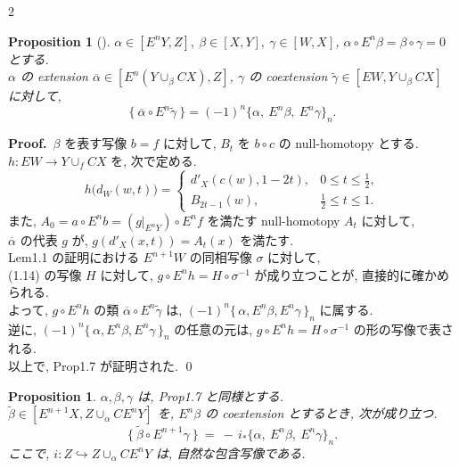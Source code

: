 \documentclass[10pt, leqno]{ltjsarticle}
\newcommand{\Ex}{E}        %
\newcommand{\todai}[2][]{\{\,#2\,\}_{#1}}      %
\numberwithin{equation}{section}
\theoremstyle{plain}
\newtheorem{proposition}[theorem]{Proposition}
\theoremstyle{definition}
\theoremstyle{remark}
\begin{document}
\begin{paracol}{2}

\begin{proposition}[]\label{prop:1-7}
\(\alpha\in[E^nY, Z],\ \beta\in[X,Y],\ \gamma\in[W,X]\),
$\alpha\circ \Ex^n\beta=\beta\circ\gamma=0$ とする. \\
$\alpha$ の extension $\overline\alpha\in[\Ex^n(Y\cup_\beta CX), Z]$,
$\gamma$ の coextension $\widetilde\gamma\in[EW, Y\cup_\beta CX]$ に対して,
\[
\{\ \overline\alpha\circ \Ex^n\widetilde\gamma\ \}
= (-1)^n\{\alpha,\ \Ex^n\beta,\ \Ex^n\gamma\}_n.
\]
\end{proposition}

\noindent
\textbf{Proof.}\
\(\beta\) を表す写像 \(b = f\) に対して, 
\(B_t\) を \(b\circ c\) の null-homotopy とする.\\
$h:EW\to Y\cup_f CX$ を,
次で定める.
\[
h\bigl(d_W(w,t)\bigr)=
\begin{cases}
d'_X(c(w),1-2t), & 0\le t\le \tfrac12,\\
B_{2t-1}(w), & \tfrac12\le t\le 1.
\end{cases}
\]
また, \(A_0 = a\circ E^n b = (g|_{E^n Y})\circ E^n f\)
を満たす null-homotopy \(A_t\) に対して,\\
\(\overline{\alpha}\) の代表 \(g\) が,
\(g(d'_X(x, t)) = A_t(x)\) を満たす.\\
Lem1.1 の証明における \(E^{n+1}W\) の同相写像 \(\sigma\) に対して,\\
(1.14) の写像 \(H\) に対して,
\(g\circ E^n h = H\circ \sigma^{-1}\) が成り立つことが,
直接的に確かめられる.\\
よって,
\(g\circ E^n h\) の類 \(\overline{\alpha}\circ E^n\widetilde{\gamma}\)
は, \((-1)^n\todai[n]{\alpha, E^n\beta, E^n\gamma}\) に属する.\\
逆に,
\((-1)^n\todai[n]{\alpha, E^n\beta, E^n\gamma}\)
の任意の元は, 
\(g\circ E^n h = H\circ\sigma^{-1}\)
の形の写像で表される.\\
以上で, Prop1.7 が証明された.
\qed


\begin{proposition}\label{prop:1-8}
$\alpha,\beta,\gamma$ は, \textnormal{Prop1.7} と同様とする. \\
$\widetilde{\beta}\in[\Ex^{n+1}X, Z\cup_\alpha C\Ex^nY]$ を,
$E^n\beta$ の \emph{coextension} とするとき,
次が成り立つ.
\[
\bigl\{\ \widetilde{\beta}\circ\Ex^{n+1}\gamma\ \bigr\}
\ =\
-\,i_*\bigl\{\alpha,\ \Ex^n\beta,\ \Ex^n\gamma\bigr\}_n.
\]
ここで, $i:Z\hookrightarrow Z\cup_\alpha C\Ex^nY$ は,
自然な包含写像である. 
\end{proposition}


\end{paracol}
\end{document}
